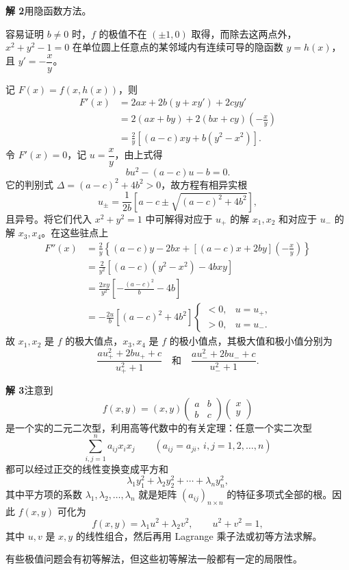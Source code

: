 \begin{xsolution}
\textbf{解 2}\quad 用隐函数方法。

容易证明 $b\ne0$ 时，$f$ 的极值不在 $(\pm1,0)$ 取得，而除去这两点外，$x^2+y^2-1=0$ 在单位圆上任意点的某邻域内有连续可导的隐函数 $y=h(x)$，且 $y'=-\dfrac{x}{y}$。

记 $F(x)=f(x,h(x))$，则
\[
\begin{aligned}
  F'(x)
  &=2ax+2b(y+xy')+2cyy'\\
  &=2(ax+by)+2(bx+cy)\left(-\frac{x}{y}\right)\\
  &=\frac2y[(a-c)xy+b(y^2-x^2)].
\end{aligned}
\]
令 $F'(x)=0$，记 $u=\dfrac{x}{y}$，由上式得
\[
  bu^2-(a-c)u-b=0.
\]
它的判别式 $\Delta=(a-c)^2+4b^2>0$，故方程有相异实根
\[
  u_\pm=\frac1{2b}\left[a-c\pm\sqrt{(a-c)^2+4b^2}\right],
\]
且异号。将它们代入 $x^2+y^2=1$ 中可解得对应于 $u_+$ 的解 $x_1,x_2$ 和对应于 $u_-$ 的解 $x_3,x_4$。在这些驻点上
\[
\begin{aligned}
  F''(x)
  &=\frac2y\left\{(a-c)y-2bx+[(a-c)x+2by]\left(-\frac{x}{y}\right)\right\}\\
  &=\frac2{y^2}[(a-c)(y^2-x^2)-4bxy]\\
  &=\frac{2xy}{y^2}\left[-\frac{(a-c)^2}{b}-4b\right]\\
  &=-\frac{2u}{b}[(a-c)^2+4b^2]
  \begin{cases}
    <0,&u=u_+,\\
    >0,&u=u_-.
  \end{cases}
\end{aligned}
\]
故 $x_1,x_2$ 是 $f$ 的极大值点，$x_3,x_4$ 是 $f$ 的极小值点，其极大值和极小值分别为
\[
  \frac{au_+^2+2bu_++c}{u_+^2+1}
  \quad\text{和}\quad
  \frac{au_-^2+2bu_-+c}{u_-^2+1}.
\]

\textbf{解 3}\quad 注意到
\[
  f(x,y)=(x,y)\begin{pmatrix}a&b\\b&c\end{pmatrix}\begin{pmatrix}x\\y\end{pmatrix}
\]
是一个实的二元二次型，利用高等代数中的有关定理：任意一个实二次型
\[
  \sum_{i,j=1}^n a_{ij}x_ix_j\qquad(a_{ij}=a_{ji},\ i,j=1,2,\ldots,n)
\]
都可以经过正交的线性变换变成平方和
\[
  \lambda_1y_1^2+\lambda_2y_2^2+\cdots+\lambda_ny_n^2,
\]
其中平方项的系数 $\lambda_1,\lambda_2,\ldots,\lambda_n$ 就是矩阵 $(a_{ij})_{n\times n}$ 的特征多项式全部的根。因此 $f(x,y)$ 可化为
\[
  f(x,y)=\lambda_1u^2+\lambda_2v^2,
  \qquad u^2+v^2=1,
\]
其中 $u,v$ 是 $x,y$ 的线性组合，然后再用 Lagrange 乘子法或初等方法求解。
\end{xsolution}
\begin{xremark}
有些极值问题会有初等解法，但这些初等解法一般都有一定的局限性。
\end{xremark}
